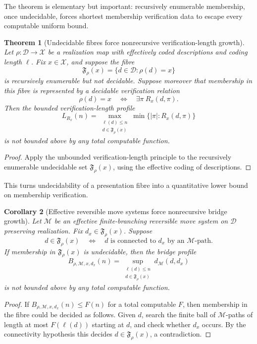 \documentclass[11pt]{article}
\newtheorem{theorem}{Theorem}[section]
\newtheorem{corollary}[theorem]{Corollary}
\begin{document}
The theorem is elementary but important: recursively enumerable membership, once undecidable, forces shortest membership verification data to escape every computable uniform bound.

\begin{theorem}[Undecidable fibres force nonrecursive verification-length growth]
Let \(\rho:\mathcal D\to\mathcal X\) be a realization map with effectively coded descriptions and coding length \(\ell\). Fix \(x\in\mathcal X\), and suppose the fibre
\[
\mathfrak F_\rho(x)=\{d\in\mathcal D:\rho(d)=x\}
\]
is recursively enumerable but not decidable. Suppose moreover that membership in this fibre is represented by a decidable verification relation
\[
\rho(d)=x
\quad\Longleftrightarrow\quad
\exists \pi\ R_x(d,\pi).
\]
Then the bounded verification-length profile
\[
L_{R_x}(n)=
\max_{\substack{\ell(d)\leq n\\d\in\mathfrak F_\rho(x)}}
\min\{|\pi|:R_x(d,\pi)\}
\]
is not bounded above by any total computable function.
\end{theorem}

\begin{proof}
Apply the unbounded verification-length principle to the recursively enumerable undecidable set \(\mathfrak F_\rho(x)\), using the effective coding of descriptions.
\end{proof}

This turns undecidability of a presentation fibre into a quantitative lower bound on membership verification.

\begin{corollary}[Effective reversible move systems force nonrecursive bridge growth]
Let \(\mathcal M\) be an effective finite-branching reversible move system on \(\mathcal D\) preserving realization. Fix \(d_x\in\mathfrak F_\rho(x)\). Suppose
\[
d\in\mathfrak F_\rho(x)
\quad\Longleftrightarrow\quad
d\text{ is connected to }d_x\text{ by an }\mathcal M\text{-path}.
\]
If membership in \(\mathfrak F_\rho(x)\) is undecidable, then the bridge profile
\[
B_{\rho,\mathcal M,x,d_x}(n)=
\sup_{\substack{\ell(d)\leq n\\ d\in\mathfrak F_\rho(x)}}
d_{\mathcal M}(d,d_x)
\]
is not bounded above by any total computable function.
\end{corollary}

\begin{proof}
If \(B_{\rho,\mathcal M,x,d_x}(n)\leq F(n)\) for a total computable \(F\), then membership in the fibre could be decided as follows. Given \(d\), search the finite ball of \(\mathcal M\)-paths of length at most \(F(\ell(d))\) starting at \(d\), and check whether \(d_x\) occurs. By the connectivity hypothesis this decides \(d\in\mathfrak F_\rho(x)\), a contradiction.
\end{proof}
\end{document}
